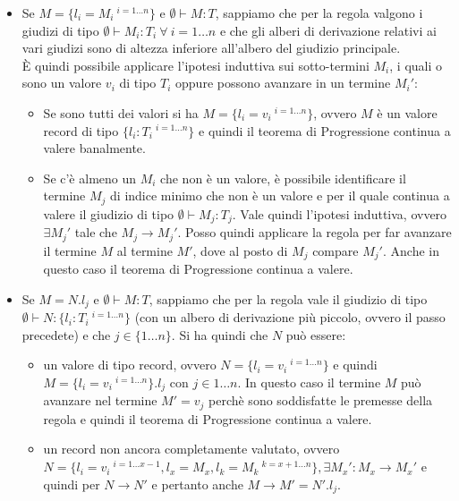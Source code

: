 \begin{itemize}
	\item {} Se $M = \{ l_i = M_i \:^{i = 1 \ldots n} \}$ e $\emptyset \vdash M : T$, sappiamo che per la regola  valgono i giudizi di tipo $\emptyset \vdash M_i : T_i \: \forall \: i = 1\ldots n$ e che gli alberi di derivazione relativi ai vari giudizi sono di altezza inferiore all'albero del giudizio principale.\\ \`E quindi possibile applicare l'ipotesi induttiva sui sotto-termini $M_i$, i quali o sono un valore $v_i$ di tipo $T_i$ oppure possono avanzare in un termine $M_i'$:
	\begin{itemize}
		\item Se sono tutti dei valori si ha $M = \{ l_i = v_i \:^{i = 1 \ldots n} \}$, ovvero $M$ \`e un valore record di tipo $\{ l_i : T_i \:^{i = 1 \ldots n} \}$ e quindi il teorema di Progressione continua a valere banalmente.
		\item Se c'\`e almeno un $M_i$ che non \`e un valore, \`e possibile identificare il termine $M_j$ di indice minimo che non \`e un valore e per il quale continua a valere il giudizio di tipo $\emptyset \vdash M_j : T_j$. Vale quindi l'ipotesi induttiva, ovvero $\exists M_j'$ tale che $M_j \to M_j'$. Posso quindi applicare la regola  per far avanzare il termine $M$ al termine $M'$, dove al posto di $M_j$ compare $M_j'$. Anche in questo caso il teorema di Progressione continua a valere.
	\end{itemize}
	\item {} Se $M = N.l_j$ e $\emptyset \vdash M : T$, sappiamo che per la regola  vale il giudizio di tipo $\emptyset \vdash N : \{ l_i : T_i \:^{i = 1 \ldots n}\}$ (con un albero di derivazione pi\`u piccolo, ovvero il passo precedete) e che $j \in \{1 \ldots n\}$.
	Si ha quindi che $N$ pu\`o essere:
	\begin{itemize}
		\item un valore di tipo record, ovvero $N = \{ l_i = v_i \:^{i = 1 \ldots n} \}$ e quindi $M = \{ l_i = v_i \:^{i = 1 \ldots n} \}.l_j$ con $j \in 1 \ldots n$. In questo caso il termine $M$ pu\`o avanzare nel termine $M' = v_j$ perch\`e sono soddisfatte le premesse della regola  e quindi il teorema di Progressione continua a valere.
		
		\item un record non ancora completamente valutato, ovvero $N = \{ l_i = v_i \:^{i = 1 \ldots x-1}, l_x = M_x, l_k = M_k \:^{k = x+1\ldots n}\}, \exists M_x': M_x \to M_x'$ e quindi per  $N \to N'$ e pertanto anche $M \to M' = N'.l_j$.
		

\end{itemize}
\end{itemize}
